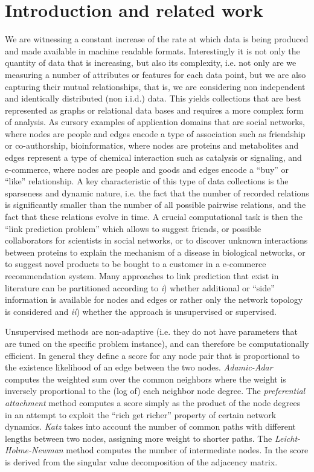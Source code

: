 \documentclass[runningheads,a4paper]{llncs}
\begin{document}
\section{Introduction and related work}
We are witnessing a constant increase of the rate at which data is being produced and made available in machine readable formats. Interestingly it is not only the quantity of data that is increasing, but also its complexity, i.e. not only are we measuring a number of attributes or features for each data point, but we are also capturing their mutual relationships, that is, we are considering non independent and identically distributed (non i.i.d.) data. This yields collections that are best represented as graphs or relational data bases and requires a more complex form of analysis. As cursory examples of application domains that are social networks, where nodes are people and edges encode a type of association such as friendship or co-authorship, bioinformatics, where nodes are proteins and metabolites and edges represent a type of chemical interaction such as catalysis or signaling, and e-commerce, where nodes are people and goods and edges encode a ``buy'' or ``like'' relationship.
A key characteristic of this type of data collections is the sparseness and dynamic nature, i.e. the fact that the number of recorded relations is significantly smaller than the number of all possible pairwise relations, and the fact that these relations evolve in time. A crucial computational task is then the ``link prediction problem'' which allows to suggest friends, or possible collaborators for scientists in social networks, or to discover unknown interactions between proteins to explain the mechanism of a disease in biological networks, or to suggest novel products to be bought to a customer in a e-commerce recommendation system. Many approaches to link prediction that exist in literature can be partitioned according to \textit{i}) whether additional or ``side'' information is available for nodes and edges or rather only the network topology is considered and \textit{ii}) whether the approach is unsupervised or supervised. 

Unsupervised methods are non-adaptive (i.e. they do not have parameters that are tuned on the specific problem instance), and can therefore be computationally efficient. In general they define a score for any node pair that is proportional to the existence likelihood of an edge between the two nodes. \textit{Adamic-Adar} \cite{adamic} computes the weighted sum over the common neighbors where the weight is inversely proportional to the (log of) each neighbor node degree. The \textit{preferential attachment} method computes a score simply as the product of the node degrees in an attempt to exploit the ``rich get richer'' property of certain network dynamics. \textit{Katz} \cite{katz} takes into account the number of common paths with different lengths between two nodes, assigning more weight to shorter paths. The \textit{Leicht-Holme-Newman} method \cite{lhni} computes the number of intermediate nodes. In \cite{matrix-factorization} the score is derived from the singular value decomposition of the adjacency matrix. 
\end{document}
